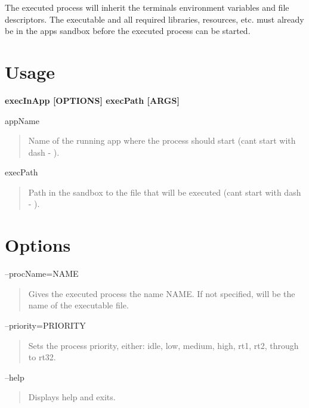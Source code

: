 The executed process will inherit the terminal\textquotesingle{}s environment variables and file descriptors. The executable and all required libraries, resources, etc. must already be in the app\textquotesingle{}s sandbox before the executed process can be started.

\section*{Usage}

{\bfseries {\ttfamily  exec\+In\+App \mbox{[}O\+P\+T\+I\+O\+N\+S\mbox{]} exec\+Path \mbox{[}A\+R\+G\+S\mbox{]} }}

\begin{DoxyVerb}appName \end{DoxyVerb}
 \begin{quote}
Name of the running app where the process should start (can\textquotesingle{}t start with dash -\/ ). \end{quote}


\begin{DoxyVerb}execPath \end{DoxyVerb}
 \begin{quote}
Path in the sandbox to the file that will be executed (can\textquotesingle{}t start with dash -\/ ). \end{quote}


\section*{Options}

\begin{DoxyVerb}--procName=NAME \end{DoxyVerb}
 \begin{quote}
Gives the executed process the name N\+A\+M\+E. If not specified, will be the name of the executable file. \end{quote}


\begin{DoxyVerb}--priority=PRIORITY \end{DoxyVerb}
 \begin{quote}
Sets the process priority, either\+: idle, low, medium, high, rt1, rt2, through to rt32. \end{quote}


\begin{DoxyVerb}--help \end{DoxyVerb}
 \begin{quote}
Displays help and exits. \end{quote}



